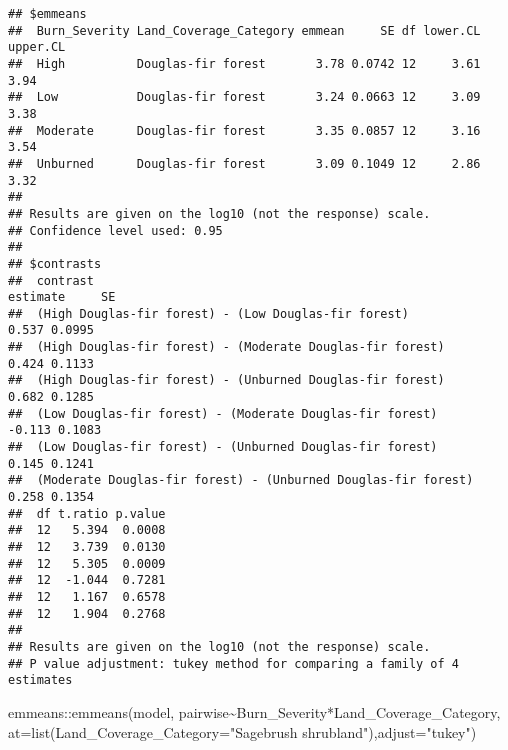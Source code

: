\documentclass[
]{article}
\newenvironment{Shaded}{\begin{snugshade}}{\end{snugshade}}
\newcommand{\AttributeTok}[1]{\textcolor[rgb]{0.77,0.63,0.00}{#1}}
\newcommand{\FunctionTok}[1]{\textcolor[rgb]{0.00,0.00,0.00}{#1}}
\newcommand{\NormalTok}[1]{#1}
\newcommand{\SpecialCharTok}[1]{\textcolor[rgb]{0.00,0.00,0.00}{#1}}
\newcommand{\StringTok}[1]{\textcolor[rgb]{0.31,0.60,0.02}{#1}}
\begin{document}
\begin{verbatim}
## $emmeans
##  Burn_Severity Land_Coverage_Category emmean     SE df lower.CL upper.CL
##  High          Douglas-fir forest       3.78 0.0742 12     3.61     3.94
##  Low           Douglas-fir forest       3.24 0.0663 12     3.09     3.38
##  Moderate      Douglas-fir forest       3.35 0.0857 12     3.16     3.54
##  Unburned      Douglas-fir forest       3.09 0.1049 12     2.86     3.32
## 
## Results are given on the log10 (not the response) scale. 
## Confidence level used: 0.95 
## 
## $contrasts
##  contrast                                                      estimate     SE
##  (High Douglas-fir forest) - (Low Douglas-fir forest)             0.537 0.0995
##  (High Douglas-fir forest) - (Moderate Douglas-fir forest)        0.424 0.1133
##  (High Douglas-fir forest) - (Unburned Douglas-fir forest)        0.682 0.1285
##  (Low Douglas-fir forest) - (Moderate Douglas-fir forest)        -0.113 0.1083
##  (Low Douglas-fir forest) - (Unburned Douglas-fir forest)         0.145 0.1241
##  (Moderate Douglas-fir forest) - (Unburned Douglas-fir forest)    0.258 0.1354
##  df t.ratio p.value
##  12   5.394  0.0008
##  12   3.739  0.0130
##  12   5.305  0.0009
##  12  -1.044  0.7281
##  12   1.167  0.6578
##  12   1.904  0.2768
## 
## Results are given on the log10 (not the response) scale. 
## P value adjustment: tukey method for comparing a family of 4 estimates
\end{verbatim}

\begin{Shaded}
\begin{Highlighting}[]
\NormalTok{emmeans}\SpecialCharTok{::}\FunctionTok{emmeans}\NormalTok{(model, pairwise}\SpecialCharTok{\textasciitilde{}}\NormalTok{Burn\_Severity}\SpecialCharTok{*}\NormalTok{Land\_Coverage\_Category, }\AttributeTok{at=}\FunctionTok{list}\NormalTok{(}\AttributeTok{Land\_Coverage\_Category=}\StringTok{"Sagebrush shrubland"}\NormalTok{),}\AttributeTok{adjust=}\StringTok{"tukey"}\NormalTok{) }
\end{Highlighting}
\end{Shaded}
\end{document}
